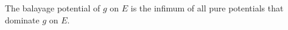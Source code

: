 The balayage potential of $g$ on $E$ is the infimum of all pure potentials that dominate $g$ on $E$.
